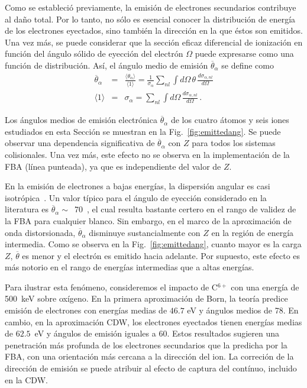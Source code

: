 Como se estableció previamente, la emisión de electrones secundarios 
contribuye al daño total. Por lo tanto, no sólo es esencial conocer la 
distribución de energía de los electrones eyectados, sino también la 
dirección en la que éstos son emitidos. Una vez más, se puede considerar 
que la sección eficaz diferencial de ionización en función del ángulo 
sólido de eyección del electrón $\Omega$ puede expresarse como una 
función de distribución. Así, el ángulo medio de emisión 
$\overline{\theta}_{\alpha}$ se define como 
\begin{eqnarray}
\overline{\theta}_{\alpha}&=&\frac{\langle\theta_{\alpha}\rangle}
{\langle 1\rangle}=\frac{1}{\sigma_{\alpha}}\sum\limits_{nl}
\int d\Omega\,\theta\,\frac{d\sigma_{\alpha,nl}}{d\Omega} 
\label{eq:meanang} \\
\langle 1\rangle &=&\sigma_{\alpha}=\sum\limits_{nl}\int d\Omega\,
\frac{d\sigma_{\alpha,nl}}{d\Omega}\,.
\end{eqnarray}

Los ángulos medios de emisión electrónica $\overline{\theta}_{\alpha}$ 
de los cuatro átomos y seis iones estudiados en esta Sección se muestran 
en la Fig.~\ref{fig:emittedang}. Se puede observar una dependencia 
significativa de $\overline{\theta}_{\alpha}$ con $Z$ para todos los 
sistemas colisionales. Una vez más, este efecto no se observa en la 
implementación de la FBA (línea punteada), ya que es independiente del 
valor de $Z$.

En la emisión de electrones a bajas energías, la dispersión angular es 
casi isotrópica~\cite{Rudd:92}. Un valor típico para el ángulo de 
eyección considerado en la literatura es 
$\overline{\theta}_{\alpha}\sim$~70\textdegree~\cite{Surdutovic:18}, el 
cual resulta bastante certero en el rango de validez de la FBA para 
cualquier blanco. Sin embargo, en el marco de la aproximación de onda 
distorsionada, $\overline{\theta}_{\alpha}$ disminuye sustancialmente 
con $Z$ en la región de energía intermedia. Como se observa en la 
Fig.~\ref{fig:emittedang}, cuanto mayor es la carga $Z$,
$\overline{\theta}$ es menor y el electrón es emitido hacia adelante. 
Por supuesto, este efecto es más notorio en el rango de energías 
intermedias que a altas energías.

Para ilustrar esta fenómeno, consideremos el impacto de C$^{6+}$ con una 
energía de 500~keV sobre oxígeno. En la primera aproximación de Born, la 
teoría predice emisión de electrones con energías medias de $46.7$ eV y 
ángulos medios de 78\textdegree. En cambio, en la aproximación CDW, los 
electrones eyectados tienen energías medias de $62.5$~eV y ángulos de 
emisión iguales a 60\textdegree. Estos resultados sugieren una 
penetración más profunda de los electrones secundarios que la predicha 
por la FBA, con una orientación más cercana a la dirección del ion. La 
correción de la dirección de emisión se puede atribuir al efecto de 
captura del contínuo, incluido en la CDW.

